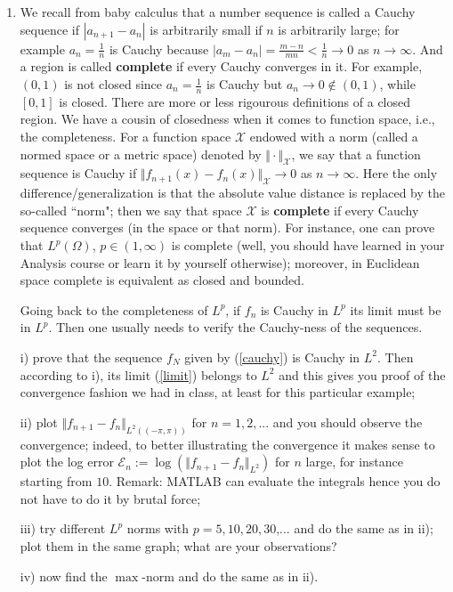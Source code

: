 \documentclass[6pt]{article}
\numberwithin{equation}{section}
\begin{document}
\begin{enumerate}
\item We recall from baby calculus that a number sequence is called a Cauchy sequence if $|a_{n+1}-a_n|$ is arbitrarily small if $n$ is arbitrarily large; for example $a_n=\frac{1}{n}$ is Cauchy because $|a_{m}-a_{n}|=\frac{m-n}{mn}<\frac{1}{n}\rightarrow 0$ as $n\rightarrow \infty$.  And a region is called \textbf{complete} if every Cauchy converges in it.  For example, $(0,1)$ is not closed since $a_n=\frac{1}{n}$ is Cauchy but $a_n\rightarrow 0\not\in (0,1)$, while $[0,1]$ is closed.  There are more or less rigourous definitions of a closed region.  We have a cousin of closedness when it comes to function space, i.e., the completeness.  For a function space $\mathcal X$ endowed with a norm (called a normed space or a metric space) denoted by $\Vert \cdot \Vert_{\mathcal X}$, we say that a function sequence is Cauchy if $\Vert f_{n+1}(x)-f_n(x) \Vert_{\mathcal X}\rightarrow 0$ as $n\rightarrow \infty$.  Here the only difference/generalization is that the absolute value distance is replaced by the so-called ``norm"; then we say that space $\mathcal X$ is \textbf{complete} if every Cauchy sequence converges (in the space or that norm).  For instance, one can prove that $L^p(\Omega)$, $p\in(1,\infty)$ is complete (well, you should have learned in your Analysis course or learn it by yourself otherwise); moreover, in Euclidean space complete is equivalent as closed and bounded.

Going back to the completeness of $L^p$, if $f_n$ is Cauchy in $L^p$ its limit must be in $L^p$.  Then one usually needs to verify the Cauchy-ness of the sequences.

i) prove that the sequence $f_N$ given by (\ref{cauchy}) is Cauchy in $L^2$.  Then according to i), its limit (\ref{limit}) belongs to $L^2$ and this gives you proof of the convergence fashion we had in class, at least for this particular example;

ii) plot $\Vert f_{n+1} -f_n \Vert_{L^2((-\pi,\pi))}$ for $n=1,2,...$ and you should observe the convergence; indeed, to better illustrating the convergence it makes sense to plot the log error $\mathcal E_n:=\log (\Vert f_{n+1} -f_n \Vert_{L^2})$ for $n$ large, for instance starting from $10$.  Remark: MATLAB can evaluate the integrals hence you do not have to do it by brutal force;

iii) try different $L^p$ norms with $p=5,10,20,30$,... and do the same as in ii); plot them in the same graph; what are your observations?

iv) now find the $\max$-norm and do the same as in ii).


\end{enumerate}
\end{document}
